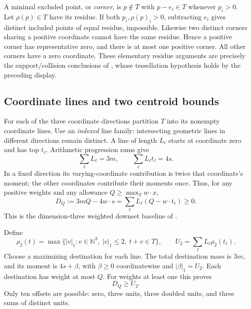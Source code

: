 A minimal excluded point, or \emph{corner}, is \(p\notin T\) with
\(p-e_i\in T\) whenever \(p_i>0\). Let \(\rho(p)\in T\) have its residue.
If both \(p_i,\rho(p)_i>0\), subtracting \(e_i\) gives distinct included
points of equal residue, impossible. Likewise two distinct corners
sharing a positive coordinate cannot have the same residue.
Hence a positive corner has representative zero, and there is at most one
positive corner. All other corners have a zero coordinate.
These elementary residue arguments are precisely the support/collision
conclusions of \cite[Proposition~2.6]{HRW}, whose tessellation hypothesis
holds by the preceding display.

\subsection{Coordinate lines and two centroid bounds}\label{sec:p2}

For each of the three coordinate directions partition \(T\) into its
nonempty coordinate lines. Use an \emph{indexed} line family: intersecting
geometric lines in different directions remain distinct.
A line of length \(L_\ell\) starts at coordinate zero and has top \(t_\ell\).
Arithmetic progression sums give
\begin{equation}
\sum_\ell L_\ell=3m,\qquad
\sum_\ell L_\ell t_\ell=4s.
\label{eq:p:2}
\end{equation}
In a fixed direction its varying-coordinate contribution is twice that
coordinate's moment; the other coordinates contribute their moments once.
Thus, for any positive weights and any allowance \(Q\ge\max_Tw\cdot x\),
\begin{equation}
D_Q:=3mQ-4w\cdot s
=\sum_\ell L_\ell(Q-w\cdot t_\ell)\ge0.
\label{eq:p:3}
\end{equation}
This is the dimension-three weighted downset baseline of \cite[Lemma~3]{Z}.

Define
\[
\rho_2(t)=\max\{|v|_1:v\in\mathbb N^3,\ |v|_1\le2,\ t+v\in T\},
\qquad U_2=\sum_\ell L_\ell\rho_2(t_\ell).
\]
Choose a maximizing destination for each line. The total destination mass
is \(3m\), and its moment is \(4s+\beta\), with \(\beta\ge0\)
coordinatewise and \(|\beta|_1=U_2\). Each destination has weight at most
\(Q\). For weights at least one this proves
\begin{equation}
D_Q\ge U_2.
\label{eq:p:4}
\end{equation}
Only ten offsets are possible: zero, three units, three doubled units,
and three sums of distinct units.


